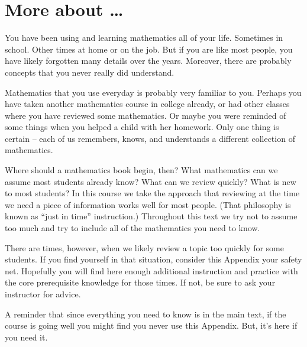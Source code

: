 \appendix

\chapter{More about \ldots}

You have been using and learning mathematics all of your life.  Sometimes in school.  Other times at home or on the job.  But if you are like most people, you have likely forgotten many details over the years.  Moreover, there are probably concepts that you never really did understand.  

Mathematics that you use everyday is probably very familiar to you.  Perhaps you have taken another mathematics course in college already, or had other classes where you have reviewed some mathematics.  Or maybe you were reminded of some things when you helped a child with her homework.  Only one thing is certain -- each of us remembers, knows, and understands a different collection of mathematics.  

Where should a mathematics book begin, then?  What mathematics can we assume most students already know?  What can we review quickly?  What is new to most students?  In this course we take the approach that reviewing at the time we need a piece of information works well for most people.  (That philosophy is known as ``just in time'' instruction.) Throughout this text we try not to assume too much and try to include all of the mathematics you need to know.  

There are times, however, when we likely review a topic too quickly for some students.  If you find yourself in that situation, consider this Appendix your safety net.  Hopefully you will find here enough additional instruction and practice with the core prerequisite knowledge for those times.  If not, be sure to ask your instructor for advice.

A reminder that since everything you need to know is in the main text, if the course is going well you might find you never use this Appendix.  But, it's here if you need it.